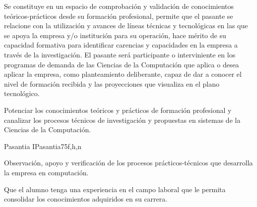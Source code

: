 \begin{syllabus}


\begin{justification}
Se constituye en un espacio de comprobación y validación de conocimientos teóricos-prácticos desde su formación profesional, permite que el pasante se relacione con la utilización y avances de líneas técnicas y tecnológicas en las que se apoya la empresa y/o institución para su operación, hace mérito de su capacidad formativa para identificar carencias y capacidades en la empresa a través de la investigación. El pasante será participante o interviniente en los programas de demanda de las Ciencias de la Computación que aplica o desea aplicar la empresa, como planteamiento deliberante, capaz de dar a conocer el nivel de formación recibida y las proyecciones que visualiza en el plano tecnológico.  
\end{justification}

\begin{goals}
\item Potenciar los conocimientos teóricos y prácticos de formación profesional y 
canalizar los procesos técnicos de investigación y propuestas en sistemas de la 
Ciencias de la Computación. 
\end{goals}

\begin{outcomes}
\end{outcomes}

\begin{unit}{Pasantia I}{Pasantia}{75}{f,h,n}
   \begin{topics}
      \item Observación, apoyo y verificación de los procesos prácticos-técnicos que desarrolla la empresa en computación.
   \end{topics}

   \begin{unitgoals}
      \item Que el alumno tenga una experiencia en el campo laboral que le permita consolidar los conocimientos adquiridos en su carrera.
   \end{unitgoals}
\end{unit}
   
\begin{coursebibliography}
\end{coursebibliography}
\end{syllabus}
